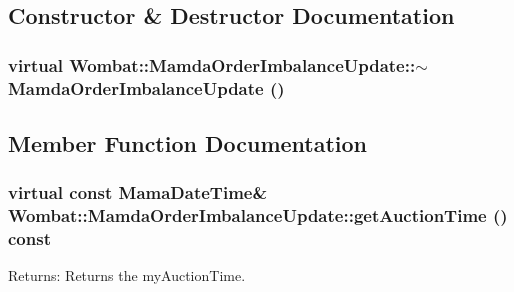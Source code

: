 \subsection{Constructor \& Destructor Documentation}
\hypertarget{classWombat_1_1MamdaOrderImbalanceUpdate_b20a79356ed58746f3c091dd4fff9d23}{
\subsubsection[$\sim$MamdaOrderImbalanceUpdate]{\setlength{\rightskip}{0pt plus 5cm}virtual Wombat::Mamda\-Order\-Imbalance\-Update::$\sim$Mamda\-Order\-Imbalance\-Update ()}}
\label{classWombat_1_1MamdaOrderImbalanceUpdate_b20a79356ed58746f3c091dd4fff9d23}




\subsection{Member Function Documentation}
\hypertarget{classWombat_1_1MamdaOrderImbalanceUpdate_b6d90b7fe1040ca61150eaa4a563b1bc}{
\subsubsection[getAuctionTime]{\setlength{\rightskip}{0pt plus 5cm}virtual const Mama\-Date\-Time\& Wombat::Mamda\-Order\-Imbalance\-Update::get\-Auction\-Time () const}}
\label{classWombat_1_1MamdaOrderImbalanceUpdate_b6d90b7fe1040ca61150eaa4a563b1bc}


\begin{Desc}
\item[Returns:]Returns the my\-Auction\-Time. \end{Desc}



